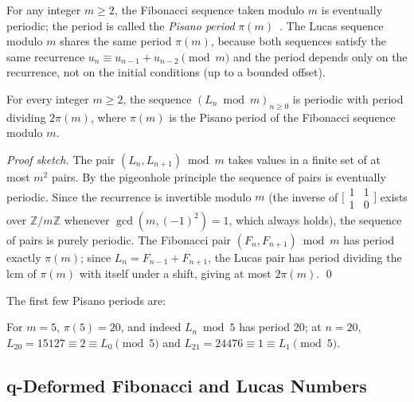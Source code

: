 For any integer \(m \geq 2\), the Fibonacci sequence taken modulo \(m\)
is eventually periodic; the period is called the
\emph{Pisano period} \(\pi(m)\)~\cite{vorobiev2003fibonacci}.
The Lucas sequence modulo \(m\) shares the same period \(\pi(m)\),
because both sequences satisfy the same recurrence
\(u_n \equiv u_{n-1} + u_{n-2} \pmod{m}\) and the period depends only
on the recurrence, not on the initial conditions (up to a bounded offset).

\begin{theorem}
\label{thm:gh-pisano}
For every integer \(m \geq 2\),
the sequence \((L_n \bmod m)_{n \geq 0}\) is periodic with period
dividing \(2\pi(m)\), where \(\pi(m)\) is the Pisano period of
the Fibonacci sequence modulo \(m\).
\end{theorem}

\begin{proof}[Proof sketch]
The pair \((L_{n}, L_{n+1}) \bmod m\) takes values in a finite set of
at most \(m^2\) pairs.  By the pigeonhole principle the sequence of
pairs is eventually periodic.  Since the recurrence is invertible
modulo \(m\) (the inverse of \(\bigl[\begin{smallmatrix}1&1\\1&0\end{smallmatrix}\bigr]\)
exists over \(\mathbb{Z}/m\mathbb{Z}\) whenever \(\gcd(m,(-1)^2)=1\),
which always holds), the sequence of pairs is purely periodic.
The Fibonacci pair \((F_n, F_{n+1})\bmod m\) has period exactly
\(\pi(m)\); since \(L_n = F_{n-1}+F_{n+1}\), the Lucas pair has
period dividing the lcm of \(\pi(m)\) with itself under a shift,
giving at most \(2\pi(m)\).
\qed
\end{proof}

The first few Pisano periods are:
\begin{center}
\end{center}
For \(m = 5\), \(\pi(5) = 20\), and indeed
\(L_n \bmod 5\) has period 20; at \(n = 20\),
\(L_{20} = 15127 \equiv 2 \equiv L_0 \pmod{5}\) and
\(L_{21} = 24476 \equiv 1 \equiv L_1 \pmod{5}\). \checkmark

\subsection{q-Deformed Fibonacci and Lucas Numbers}
\label{subsec:gh-qdeformed}

